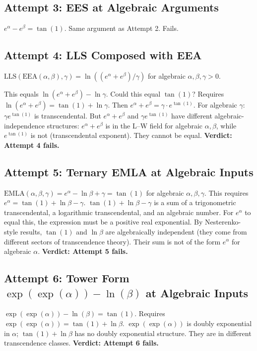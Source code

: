 \documentclass[11pt]{article}
\begin{document}
\subsection{Attempt 3: EES at Algebraic Arguments}

$e^\alpha - e^\beta = \tan(1)$. Same argument as Attempt 2. Fails.

\subsection{Attempt 4: LLS Composed with EEA}

$\mathrm{LLS}(\mathrm{EEA}(\alpha,\beta), \gamma) = \ln((e^\alpha + e^\beta)/\gamma)$
for algebraic $\alpha, \beta, \gamma > 0$.

This equals $\ln(e^\alpha + e^\beta) - \ln\gamma$.
Could this equal $\tan(1)$? Requires $\ln(e^\alpha + e^\beta) = \tan(1) + \ln\gamma$.
Then $e^\alpha + e^\beta = \gamma \cdot e^{\tan(1)}$.
For algebraic $\gamma$: $\gamma e^{\tan(1)}$ is transcendental.
But $e^\alpha + e^\beta$ and $\gamma e^{\tan(1)}$ have different algebraic-independence
structures: $e^\alpha + e^\beta$ is in the L--W field for algebraic $\alpha, \beta$,
while $e^{\tan(1)}$ is not (transcendental exponent). They cannot be equal.
\textbf{Verdict: Attempt 4 fails.}

\subsection{Attempt 5: Ternary EMLA at Algebraic Inputs}

$\mathrm{EMLA}(\alpha, \beta, \gamma) = e^\alpha - \ln\beta + \gamma = \tan(1)$
for algebraic $\alpha, \beta, \gamma$.
This requires $e^\alpha = \tan(1) + \ln\beta - \gamma$.
$\tan(1) + \ln\beta - \gamma$ is a sum of a trigonometric transcendental,
a logarithmic transcendental, and an algebraic number. For $e^\alpha$ to equal this,
the expression must be a positive real exponential.
By Nesterenko-style results, $\tan(1)$ and $\ln\beta$ are algebraically independent
(they come from different sectors of transcendence theory).
Their sum is not of the form $e^\alpha$ for algebraic $\alpha$.
\textbf{Verdict: Attempt 5 fails.}

\subsection{Attempt 6: Tower Form $\exp(\exp(\alpha)) - \ln(\beta)$ at Algebraic Inputs}

$\exp(\exp(\alpha)) - \ln(\beta) = \tan(1)$.
Requires $\exp(\exp(\alpha)) = \tan(1) + \ln\beta$.
$\exp(\exp(\alpha))$ is doubly exponential in $\alpha$; $\tan(1) + \ln\beta$ has
no doubly exponential structure. They are in different transcendence classes.
\textbf{Verdict: Attempt 6 fails.}
\end{document}
